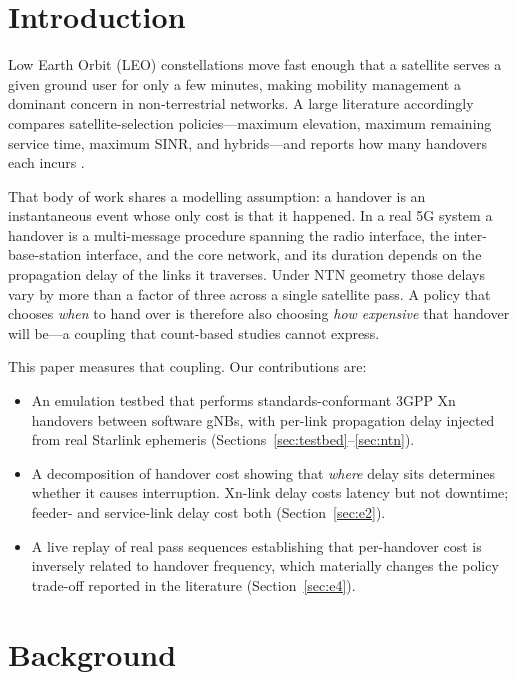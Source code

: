 \documentclass[conference]{IEEEtran}
\begin{document}
\section{Introduction}

Low Earth Orbit (LEO) constellations move fast enough that a satellite serves a
given ground user for only a few minutes, making mobility management a dominant
concern in non-terrestrial networks. A large literature accordingly compares
satellite-selection policies---maximum elevation, maximum remaining service
time, maximum SINR, and hybrids---and reports how many handovers each incurs
\cite{ref_hybrid,ref_demand,ref_optimal,ref_graph}.

That body of work shares a modelling assumption: a handover is an instantaneous
event whose only cost is that it happened. In a real 5G system a handover is a
multi-message procedure spanning the radio interface, the inter-base-station
interface, and the core network, and its duration depends on the propagation
delay of the links it traverses. Under NTN geometry those delays vary by more
than a factor of three across a single satellite pass. A policy that chooses
\emph{when} to hand over is therefore also choosing \emph{how expensive} that
handover will be---a coupling that count-based studies cannot express.

This paper measures that coupling. Our contributions are:

\begin{itemize}
\item An emulation testbed that performs standards-conformant 3GPP Xn handovers
between software gNBs, with per-link propagation delay injected from real
Starlink ephemeris (Sections~\ref{sec:testbed}--\ref{sec:ntn}).
\item A decomposition of handover cost showing that \emph{where} delay sits
determines whether it causes interruption. Xn-link delay costs latency but not
downtime; feeder- and service-link delay cost both (Section~\ref{sec:e2}).
\item A live replay of real pass sequences establishing that per-handover cost
is inversely related to handover frequency, which materially changes the
policy trade-off reported in the literature (Section~\ref{sec:e4}).
\end{itemize}

\section{Background}
\end{document}
